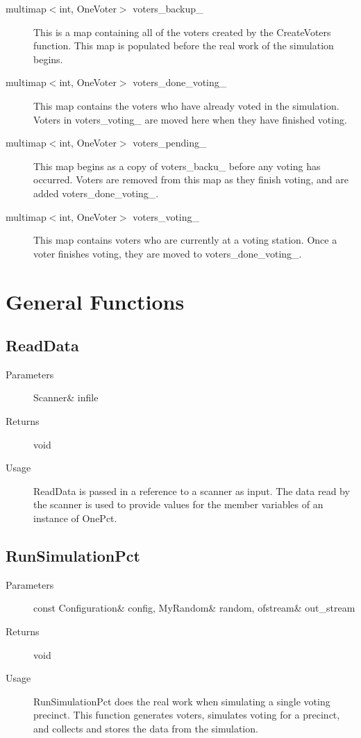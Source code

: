 \begin{description}
\item[multimap$<$int, OneVoter$>$ voters\_backup\_] This is a map containing all of the voters created by the CreateVoters function.  This map is populated before the real work of the simulation begins.
\item[multimap$<$int, OneVoter$>$ voters\_done\_voting\_] This map contains the voters who have already voted in the simulation. Voters in voters\_voting\_ are moved here when they have finished voting.
\item[multimap$<$int, OneVoter$>$ voters\_pending\_] This map begins as a copy of voters\_backu\_ before any voting has occurred. Voters are removed from this map as they finish voting, and are added voters\_done\_voting\_.
\item[multimap$<$int, OneVoter$>$ voters\_voting\_] This map contains voters who are currently at a voting station. Once a voter finishes voting, they are moved to voters\_done\_voting\_.
\end{description}

\section{General Functions}

\subsection{ReadData}
\begin{description}
\item[Parameters] Scanner\& infile
\item[Returns] void
\item[Usage] ReadData is passed in a reference to a scanner as input.  The data read by the scanner is used to provide values for the member variables of an instance of OnePct.
\end{description}


\subsection{RunSimulationPct}
\begin{description}
\item[Parameters] const Configuration\& config, MyRandom\& random, ofstream\& out\_stream
\item[Returns] void
\item[Usage] RunSimulationPct does the real work when simulating a single voting precinct.  This function generates voters, simulates voting for a precinct, and collects and stores the data from the simulation.
\end{description}


